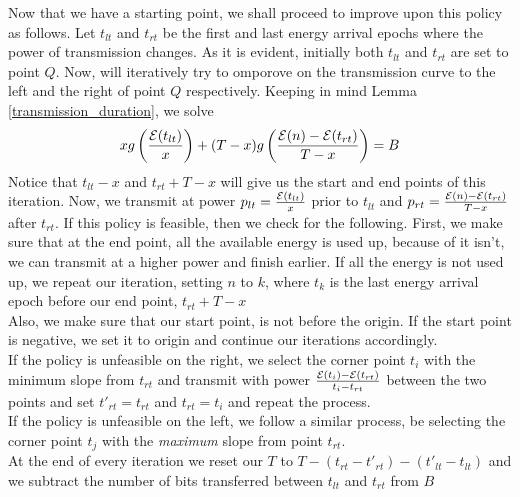 Now that we have a starting point, we shall proceed to improve upon this policy as follows. Let $t_{lt}$ and $t_{rt}$ be the first and last energy arrival epochs where the power of transmission changes. 
As it is evident, initially both $t_{lt}$ and $t_{rt}$ are set to point $Q$. Now, will iteratively try to omporove on the transmission curve to the left and the right of point $Q$ respectively. 
Keeping in mind Lemma \ref{transmission_duration}, we solve 
\begin{align}
xg\left(\frac{\mathcal{E}(t_{lt})}{x}\right) + (T-x)g\left(\frac{\mathcal{E}(n)-\mathcal{E}(t_{rt})}{T-x}\right) = B
\end{align}
Notice that $t_{lt} - x$ and $t_{rt} + T-x$ will give us the start and end points of this iteration. Now, we transmit at power $p_{lt} = \frac{\mathcal{E}(t_{lt})}{x}$ prior to $t_{lt}$ and $p_{rt} = \frac{\mathcal{E}(n) - \mathcal{E}(t_{rt})}{T-x}$ after $t_{rt}$. 
If this policy is feasible, then we check for the following. First, we make sure that at the end point, all the available energy is used up, because of it isn't, we can transmit at a higher power and finish earlier. 
If all the energy is not used up, we repeat our iteration, setting $n$ to $k$, where $t_k$ is the last energy arrival epoch before our end point, $t_{rt} + T-x$  \\
Also, we make sure that our start point, is not before the origin. If the start point is negative, we set it to origin and continue our iterations accordingly.\\

If the policy is unfeasible on the right, we select the corner point $t_i$ with the minimum slope from $t_{rt}$ and transmit with power $\frac{\mathcal{E}(t_i) - \mathcal{E}(t_{rt})}{t_i-t_{rt}}$ between the two points and set $t'_{rt} = t_{rt}$ and $t_{rt} = t_i$ and repeat the process.\\
If the policy is unfeasible on the left, we follow a similar process, be selecting the corner point $t_j$ with the \textit{maximum} slope from point $t_{rt}$.\\
At the end of every iteration we reset our $T$ to $ T - (t_{rt} - t'_{rt}) - (t'_{lt} - t_{lt})$ and we subtract the number of bits transferred between $t_{lt}$ and $t_{rt}$ from $B$




